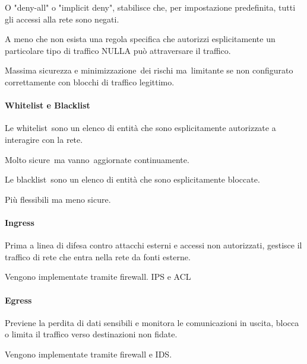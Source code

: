 \documentclass[
]{article}
\begin{document}
{O "deny-all" o "implicit deny", stabilisce che, per impostazione
predefinita, tutti gli accessi alla rete sono negati. }

{}

{A meno che non esista una regola specifica che autorizzi esplicitamente
un particolare tipo di traffico NULLA può attraversare il traffico.}

{}

{Massima sicurezza e minimizzazione}{~dei rischi }{ma}{~}{limitante se
non configurato correttamente con blocchi di traffico legittimo}{.}

\paragraph{\texorpdfstring{{Whitelist e
Blacklist}}{Whitelist e Blacklist}}\label{h.nuks22acceha}

{Le }{whitelist}{~sono un elenco }{di entità che sono esplicitamente
autorizzate a interagire con la rete.}

{}

{Molto sicure}{~}{ma }{vanno}{~aggiornate continuamente.}

{}

{Le }{blacklist}{~sono un elenco di entità che sono esplicitamente
bloccate.}

{}

{Più }{flessibili }{ma }{meno sicure.}

\paragraph{\texorpdfstring{{Ingress}}{Ingress}}\label{h.tmdv4061royr}

{Prima a linea di difesa contro attacchi esterni e accessi non
autorizzati, gestisce il traffico di rete che entra nella rete da fonti
esterne.}

{}

{Vengono implementate tramite firewall. IPS e ACL}

\paragraph{\texorpdfstring{{Egress}}{Egress}}\label{h.9vwt0xbzhcqt}

{Previene la perdita di dati sensibili e monitora le comunicazioni in
uscita, blocca o limita il traffico verso destinazioni non fidate.}

{}

{Vengono implementate tramite firewall e IDS.}
\end{document}
